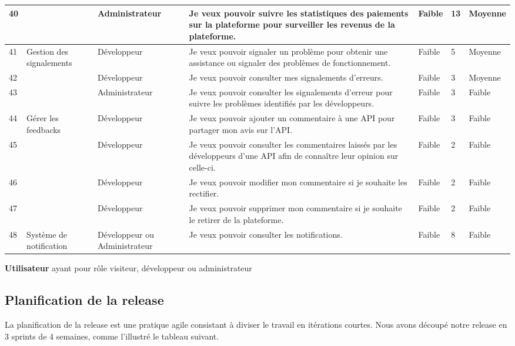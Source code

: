 \begin{longtable}[c]{
        |p{}
        |p{}
        |p{}
        |p{}
        |p{}
        |p{}
        |p{}|
    }
        \hline
        40 & & Administrateur & Je veux pouvoir suivre les statistiques des paiements sur la plateforme pour surveiller les revenus de la plateforme. & Faible & 13 & Moyenne \\
        \hline
        41 & Gestion des signalements & Développeur & Je veux pouvoir signaler un problème pour obtenir une assistance ou signaler des problèmes de fonctionnement. & Faible & 5 & Moyenne \\
        \hline
        42 & & Développeur & Je veux pouvoir consulter mes signalements d'erreurs. & Faible & 3 & Moyenne \\
        \hline
        43 & & Administrateur & Je veux pouvoir consulter les signalements d'erreur pour suivre les problèmes identifiés par les développeurs. & Faible & 3 & Faible \\
        \hline
        44 & Gérer les feedbacks & Développeur & Je veux pouvoir ajouter un commentaire à une API pour partager mon avis sur l'API. & Faible & 3 & Faible \\
        \hline
        45 & & Développeur & Je veux pouvoir consulter les commentaires laissés par les développeurs d'une API afin de connaître leur opinion sur celle-ci. & Faible & 2 & Faible \\
        \hline
        46 & & Développeur & Je veux pouvoir modifier mon commentaire si je souhaite les rectifier. & Faible & 2 & Faible \\
        \hline
        47 & & Développeur & Je veux pouvoir supprimer mon commentaire si je souhaite le retirer de la plateforme. & Faible & 2 & Faible \\
        \hline
        48 & Système de notification & Développeur ou Administrateur & Je veux pouvoir consulter les notifications. & Faible & 8 & Faible \\
        \hline
    
    \end{longtable}

    \textbf{Utilisateur } ayant pour rôle visiteur, développeur ou administrateur
    \subsection{Planification de la release } 
    La planification de la release est une pratique agile consistant à diviser le travail en itérations courtes. Nous avons découpé notre release en 3 sprints de 4 semaines, comme l’illustré le tableau suivant.

    \documentclass{article}
    \usepackage{longtable}

